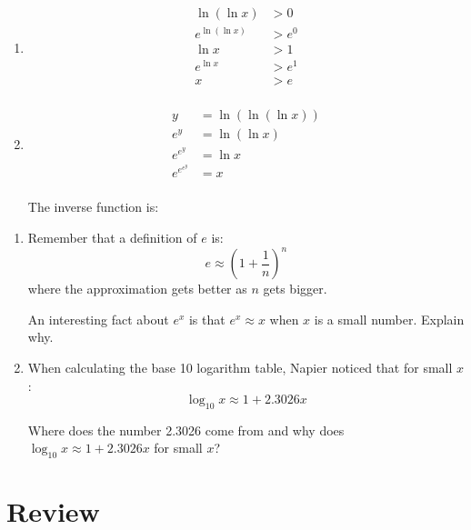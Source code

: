 \documentclass{exam}
\begin{document}
\begin{description}
\begin{enumerate}[a]
          \item 
            \begin{align*}
              \ln(\ln x)     & > 0 \\
              e^{\ln(\ln x)} & > e^0 \\
              \ln x          & > 1 \\
              e^{\ln x}      & > e^1 \\
              x              & > e \\
            \end{align*}


          \item 
            \begin{align*}
              y        &= \ln(\ln(\ln x)) \\
              e^y      &= \ln(\ln x) \\
              e^{e^y}      &= \ln x \\
              e^{e^{e^y}}      &= x \\
            \end{align*}

            The inverse function is: 
        \end{enumerate}
    \end{description}
  \fi

\begin{enumerate}
  \item 
    Remember that a definition of $e$ is:
    \[
      e \approx \left( 1 + \frac{1}{n} \right)^n
    \]
    where the approximation gets better as $n$ gets bigger.

    An interesting fact about $e^x$ is that $e^x \approx x$ when $x$ is a small number.  Explain why.

  \item 
    When calculating the base 10 logarithm table, Napier noticed that for small $x$:
    \[
      \log_{10} x \approx 1 + 2.3026x
    \]

    Where does the number 2.3026 come from and why does $\log_{10} x \approx 1 + 2.3026x$ for small $x$?
    
\end{enumerate}

  \section{Review}
\end{document}
